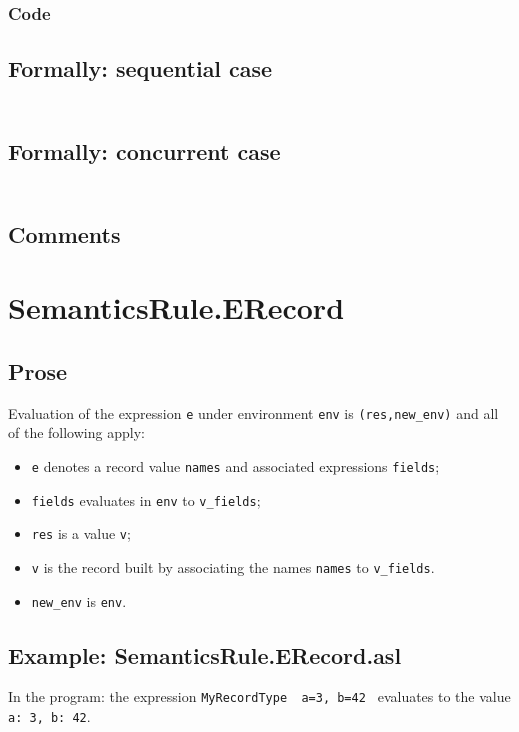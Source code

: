 \documentclass{book}
\begin{document}
  \subsubsection{Code}


  \subsection{Formally: sequential case}
  \begin{align}
  \end{align} 

  \subsection{Formally: concurrent case}
  \begin{align}
  \end{align} 

  \subsection{Comments}

\section{SemanticsRule.ERecord \label{sec:SemanticsRule.ERecord}}

  \subsection{Prose}

  Evaluation of the expression \texttt{e} under environment \texttt{env} is
  \texttt{(res,new\_env)} and all of the following apply:
  \begin{itemize}
  \item \texttt{e} denotes a record value \texttt{names} and associated expressions
    \texttt{fields};
  \item \texttt{fields} evaluates in \texttt{env} to \texttt{v\_fields};
  \item \texttt{res} is a value \texttt{v};
  \item \texttt{v} is the record built by associating the names \texttt{names} to \texttt{v\_fields}.
  \item \texttt{new\_env} is \texttt{env}.
  \end{itemize}

  \subsection{Example: SemanticsRule.ERecord.asl}
    In the program:
    the expression \texttt{MyRecordType { a=3, b=42 }} evaluates to the value \texttt{{a:
3, b: 42}}.
\end{document}
